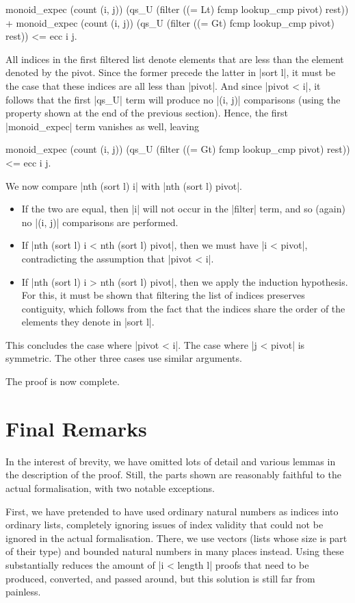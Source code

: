 \documentclass[runningheads]{llncs}
\begin{document}
\begin{code}
monoid_expec (count (i, j)) (qs_U (filter ((= Lt) fcmp lookup_cmp pivot) rest)) +
monoid_expec (count (i, j)) (qs_U (filter ((= Gt) fcmp lookup_cmp pivot) rest))
  <= ecc i j.
\end{code}
All indices in the first filtered list denote elements that are less than the element denoted by the pivot. Since the former precede the latter in |sort l|, it must be the case that these indices are all less than |pivot|. And since |pivot < i|, it follows that the first |qs_U| term will produce no |(i, j)| comparisons (using the property shown at the end of the previous section). Hence, the first |monoid_expec| term vanishes as well, leaving
\begin{code}
monoid_expec (count (i, j))
  (qs_U (filter ((= Gt) fcmp lookup_cmp pivot) rest)) <= ecc i j.
\end{code}
We now compare |nth (sort l) i| with |nth (sort l) pivot|.
\begin{itemize}
\item If the two are equal, then |i| will not occur in the |filter| term, and so (again) no |(i, j)| comparisons are performed.
\item If |nth (sort l) i < nth (sort l) pivot|, then we must have |i < pivot|, contradicting the assumption that |pivot < i|.
\item If |nth (sort l) i > nth (sort l) pivot|, then we apply the induction hypothesis. For this, it must be shown that filtering the list of indices preserves contiguity, which follows from the fact that the indices share the order of the elements they denote in |sort l|.
\end{itemize}
This concludes the case where |pivot < i|. The case where |j < pivot| is symmetric. The other three cases use similar arguments.

The proof is now complete.

\section{Final Remarks}
\label{conclusion}

In the interest of brevity, we have omitted lots of detail and various lemmas in the description of the proof. Still, the parts shown are reasonably faithful to the actual formalisation, with two notable exceptions.

First, we have pretended to have used ordinary natural numbers as indices into ordinary lists, completely ignoring issues of index validity that could not be ignored in the actual formalisation. There, we use vectors (lists whose size is part of their type) and bounded natural numbers in many places instead. Using these substantially reduces the amount of |i < length l| proofs that need to be produced, converted, and passed around, but this solution is still far from painless.
\end{document}
